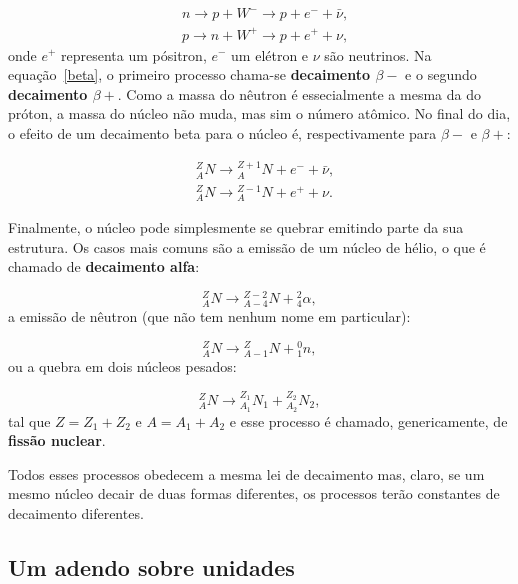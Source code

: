\documentclass{article}
\begin{document}
\begin{equation}\label{beta}
\begin{split}
&n \rightarrow p + W^-\rightarrow p + e^- + \bar{\nu},\\
&p \rightarrow n + W^+\rightarrow p + e^+ + \nu,
\end{split}
\end{equation}
onde $e^+$ representa um p\'ositron, $e^-$ um el\'etron e $\nu$ s\~ao neutrinos. Na equa\c c\~ao~\eqref{beta}, o primeiro processo chama-se \textbf{decaimento $\beta -$} e o segundo \textbf{decaimento $\beta +$}. Como a massa do n\^eutron \'e essecialmente a mesma da do pr\'oton, a massa do n\'ucleo n\~ao muda, mas sim o n\'umero at\^omico. No final do dia, o efeito de um decaimento beta para o n\'ucleo \'e, respectivamente para $\beta -$ e $\beta +$:

\begin{equation}
\begin{split}
&{}^Z_AN \rightarrow {}^{Z+1}_AN + e^- + \bar{\nu},\\
&{}^Z_AN \rightarrow {}^{Z-1}_AN + e^+ + \nu.
\end{split}
\end{equation}

Finalmente, o n\'ucleo pode simplesmente se quebrar emitindo parte da sua estrutura. Os casos mais comuns s\~ao a emiss\~ao de um n\'ucleo de h\'elio, o que \'e chamado de \textbf{decaimento alfa}:

\begin{equation}
{}^Z_AN \rightarrow {}^{Z-2}_{A-4}N + {}^2_4\alpha,
\end{equation}
a emiss\~ao de n\^eutron (que n\~ao tem nenhum nome em particular):

\begin{equation}
{}^Z_AN \rightarrow {}^{Z}_{A-1}N + {}^0_1n,
\end{equation}
ou a quebra em dois n\'ucleos pesados:

\begin{equation}
{}^Z_AN \rightarrow {}^{Z_1}_{A_1}N_1 + {}^{Z_2}_{A_2}N_2,
\end{equation}
tal que $Z = Z_1 + Z_2$ e $A = A_1 + A_2$ e esse processo \'e chamado, genericamente, de \textbf{fiss\~ao nuclear}.

Todos esses processos obedecem a mesma lei de decaimento mas, claro, se um mesmo n\'ucleo decair de duas formas diferentes, os processos ter\~ao constantes de decaimento diferentes.

\subsection{Um adendo sobre unidades}
\end{document}
